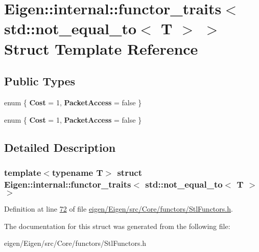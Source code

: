 \hypertarget{struct_eigen_1_1internal_1_1functor__traits_3_01std_1_1not__equal__to_3_01_t_01_4_01_4}{}\section{Eigen\+:\+:internal\+:\+:functor\+\_\+traits$<$ std\+:\+:not\+\_\+equal\+\_\+to$<$ T $>$ $>$ Struct Template Reference}
\label{struct_eigen_1_1internal_1_1functor__traits_3_01std_1_1not__equal__to_3_01_t_01_4_01_4}
\subsection*{Public Types}
\begin{DoxyCompactItemize}
\item 
\mbox{\label{struct_eigen_1_1internal_1_1functor__traits_3_01std_1_1not__equal__to_3_01_t_01_4_01_4_a12244acc7700bfc34c5eab66953a9f27}} 
enum \{ {\bfseries Cost} = 1, 
{\bfseries Packet\+Access} = false
 \}
\item 
\mbox{\label{struct_eigen_1_1internal_1_1functor__traits_3_01std_1_1not__equal__to_3_01_t_01_4_01_4_a796106f733400a34e234d50c7c46c652}} 
enum \{ {\bfseries Cost} = 1, 
{\bfseries Packet\+Access} = false
 \}
\end{DoxyCompactItemize}


\subsection{Detailed Description}
\subsubsection*{template$<$typename T$>$\newline
struct Eigen\+::internal\+::functor\+\_\+traits$<$ std\+::not\+\_\+equal\+\_\+to$<$ T $>$ $>$}



Definition at line \hyperlink{eigen_2_eigen_2src_2_core_2functors_2_stl_functors_8h_source_l00072}{72} of file \hyperlink{eigen_2_eigen_2src_2_core_2functors_2_stl_functors_8h_source}{eigen/\+Eigen/src/\+Core/functors/\+Stl\+Functors.\+h}.



The documentation for this struct was generated from the following file\+:\begin{DoxyCompactItemize}
\item 
eigen/\+Eigen/src/\+Core/functors/\+Stl\+Functors.\+h\end{DoxyCompactItemize}
